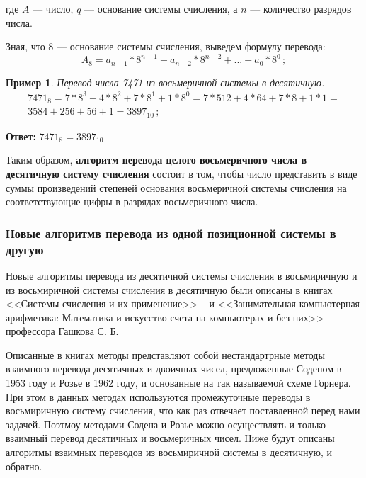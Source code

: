 \documentclass[14pt, russian]{scrartcl}
\newcounter{cExample}
\newtheorem{Example}{Пример}[cExample]
\begin{document}
где $A$ — число, $q$ — основание системы счисления, а $n$ — количество разрядов числа.

Зная, что 8 — основание системы счисления, выведем формулу перевода:
\label{Example:MathFont2}
\begin{equation}\label{eq:2}
A_8 = a_{n-1} * 8^{n-1} + a_{n-2} * 8^{n-2} + ... + a_0 * 8^0\,;
\end{equation}

\newpage
\begin{Example}\label{Example:MathFont3}
Перевод числа 7471 из восьмеричной системы в десятичную. 
\begin{equation*}\label{eq:3}
\begin{aligned}
7471_8= 7 * 8^3 + 4 * 8^2 + 7 * 8^1 + 1 * 8^0 = 7 * 512 + 4 * 64 + 7 * 8 + 1 * 1 = \\
3584 + 256 + 56 + 1 = 3897_{10}\,;
\end{aligned}
\end{equation*} 
\end{Example} 
\textbf{Ответ:} $7471_8 = 3897_{10}$ 

\vspace{1em}
Таким образом, \textbf{алгоритм перевода целого восьмеричного числа в десятичную систему счисления} состоит в том, чтобы число представить в виде суммы произведений степеней основания восьмеричной системы счисления на соответствующие цифры в разрядах восьмеричного числа.

\subsubsection{Новые алгоритмв перевода из одной позиционной системы в другую}
Новые алгоритмы перевода из десятичной системы счисления в восьмиричную и из восьмиричной системы счисления в десятичную были описаны в книгах <<Системы счисления и их применение>> ~\cite{CountSystems} и <<Занимательная компьютерная арифметика: Математика и искусство счета на компьютерах и без них>> ~\cite{ComputerArithm} профессора Гашкова С. Б.

Описанные в книгах методы представляют собой нестандартрные методы взаимного перевода десятичных и двоичных чисел, предложенные Соденом в 1953 году и Розье в 1962 году, и основанные на так называемой схеме Горнера. При этом в данных методах используются промежуточные переводы в восьмиричную систему счисления, что как раз отвечает поставленной перед нами задачей. Поэтмоу методами Содена и Розье можно осуществлять и только взаимный перевод десятичных и восьмеричных чисел. Ниже будут описаны алгоритмы взаимных переводов из восьмиричной системы в десятичную, и обратно.
\end{document}
